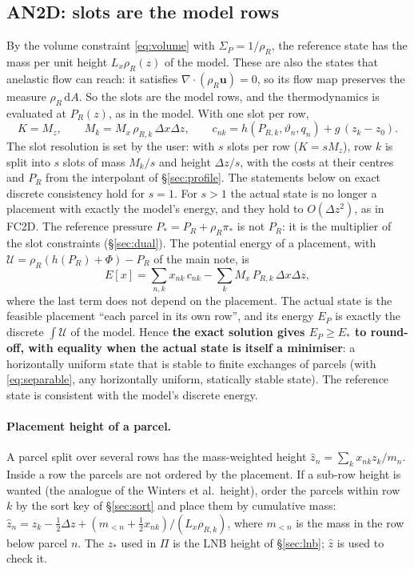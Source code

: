 \documentclass[11pt,a4paper]{article}
\newcommand{\vt}{\vartheta}
\newcommand{\zs}{z_{*}}
\newcommand{\zh}{\hat z}
\begin{document}
\subsection{AN2D: slots are the model rows}\label{sec:an-slots}
By the volume constraint \eqref{eq:volume} with $\Sigma_P=1/\rho_R$, the reference state has the mass per unit height
$L_x\rho_R(z)$ of the model. These are also the states that anelastic flow can reach: it satisfies $\nabla\cdot(\rho_R\mathbf u)=0$,
so its flow map preserves the measure $\rho_R\,\mathrm{d}A$. So the slots are the model rows, and the thermodynamics is
evaluated at $P_R(z)$, as in the model. With one slot per row,
\begin{equation}
  K=M_z,\qquad M_k=M_x\,\rho_{R,k}\,\Delta x\Delta z,\qquad c_{nk}=h(P_{R,k},\vt_n,q_n)+g\,(z_k-z_0).
  \label{eq:an-cost}
\end{equation}
The slot resolution is set by the user: with $s$ slots per row ($K=sM_z$), row $k$ is split into $s$ slots of mass $M_k/s$
and height $\Delta z/s$, with the costs at their centres and $P_R$ from the interpolant of \S\ref{sec:profile}. The statements
below on exact discrete consistency hold for $s=1$. For $s>1$ the actual state is no longer a placement with exactly the model's
energy, and they hold to $O(\Delta z^2)$, as in FC2D.
The reference pressure $P_*=P_R+\rho_R\pi_*$ is not $P_R$: it is the multiplier of the slot constraints (\S\ref{sec:dual}).
The potential energy of a placement, with $\mathcal U=\rho_R(h(P_R)+\Phi)-P_R$ of the main note, is
\begin{equation}
  E[x]=\sum_{n,k}x_{nk}\,c_{nk}-\sum_kM_x\,P_{R,k}\,\Delta x\Delta z ,
\end{equation}
where the last term does not depend on the placement. The actual state is the feasible placement ``each parcel in its own row'', and its
energy $E_P$ is exactly the discrete $\int\mathcal U$ of the model. Hence \textbf{the exact solution gives $E_P\ge E_*$ to
round-off, with equality when the actual state is itself a minimiser}: a horizontally uniform state that is stable to finite
exchanges of parcels (with \eqref{eq:separable}, any horizontally uniform, statically stable state). The reference state is
consistent with the model's discrete energy.

\paragraph{Placement height of a parcel.} A parcel split over several rows has the mass-weighted height
$\zh_n=\sum_kx_{nk}z_k/m_n$. Inside a row the parcels are not ordered by the placement. If a sub-row height is wanted
(the analogue of the Winters et al.\ height), order the parcels within row $k$ by the sort key of \S\ref{sec:sort} and place
them by cumulative mass: $\zh_n=z_k-\tfrac12\Delta z+(m_{<n}+\tfrac12x_{nk})/(L_x\rho_{R,k})$, where $m_{<n}$ is the mass
in the row below parcel $n$. The $\zs$ used in $\Pi$ is the LNB height of \S\ref{sec:lnb}; $\zh$ is used to check it.
\end{document}

